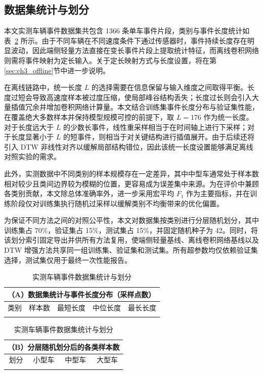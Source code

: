 \documentclass{xdupgthesis}
\begin{document}
\subsection{数据集统计与划分}
\label{subsec:ch3_split_term}

本文实测车辆事件数据集共包含 1366 条单车事件片段，类别与事件长度统计如表~\ref{tab:ch3_dataset_overview} 所示。由于不同车辆在不同速度条件下通过传感器时，事件持续长度存在明显波动，因此端侧轻量方法直接在变长事件片段上提取统计特征，而离线卷积网络则需将事件映射为定长输入。关于定长映射方式与长度设置，将在第\ref{sec:ch3_offline}节中进一步说明。

在离线链路中，统一长度 $L$ 的选择需要在信息保留与输入维度之间取得平衡。长度过短会导致高速度样本被过度压缩，使局部峰谷结构丢失；长度过长则会引入大量插值冗余并增加卷积网络计算量。本文结合训练集事件长度分布与验证集性能，在覆盖绝大多数样本并保持模型规模可控的前提下，取 $L=176$ 作为统一长度。对于长度远大于 $L$ 的少数长事件，线性重采样相当于在时间轴上进行下采样；对于长度显著小于 $L$ 的短事件，则相当于对关键结构进行插值展开。由于后续还将引入 DTW 非线性对齐以缓解局部结构错位，因此该统一长度设置能够满足离线对照实验的需求。

此外，实测数据中不同类别的样本规模存在一定差异，其中中型车通常处于样本数相对较少且类间边界较为模糊的位置，更容易成为误差集中来源。为在评价中兼顾各类别贡献，本文除总体准确率外，进一步采用宏平均 $F_1$ 作为主要指标，并在训练阶段仅对训练集执行随机过采样以缓解类别不均衡带来的优化偏置。

为保证不同方法之间的对照公平性，本文对数据集按类别进行分层随机划分，其中训练集占 70\%，验证集占 15\%，测试集占 15\%，并固定随机种子为 42。同时，将该划分索引固定导出并供所有方法复用，使端侧轻量基线、离线卷积网络基线以及 DTW 增强方法共享同一组训练集、验证集和测试集。所有超参数均仅依赖验证集选择，测试集仅用于最终一次性能报告。

\begin{table}[!htbp]
\centering
\small
\caption{实测车辆事件数据集统计与划分}
\label{tab:ch3_dataset_overview}
\setlength{\tabcolsep}{4pt}
\renewcommand{\arraystretch}{1.15}

\begin{tabular}{c c c c c}
\hline
\multicolumn{5}{l}{（A）数据集统计与事件长度分布（采样点数）} \\
\hline
类别 & 样本数 & 最短长度 & 中位长度 & 最长长度 \\
\hline
\\
\hline
\end{tabular}

\vspace{2mm}

\begin{tabular}{c c c c}
\hline
\multicolumn{4}{l}{（B）分层随机划分后的各类样本数} \\
\hline
划分 & 小型车 & 中型车 & 大型车 \\
\hline
\\
\hline
\end{tabular}
\end{table}
\end{document}
